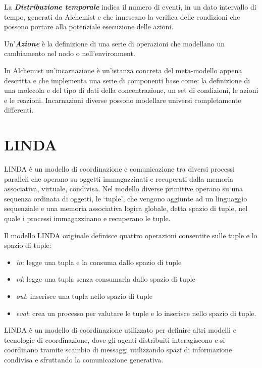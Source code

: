 La \textbf{\textit{Distribuzione temporale}} indica il numero di eventi, in un dato intervallo di tempo, generati da Alchemist e che innescano la verifica delle condizioni che possono portare alla potenziale esecuzione delle azioni.

Un'\textbf{\textit{Azione}} è la definizione di una serie di operazioni che modellano un cambiamento nel nodo o nell'environment.

In Alchemist un'incarnazione è un'istanza concreta del meta-modello appena descritta e che implementa una serie di componenti base come: la definizione di una molecola e del tipo di dati della concentrazione, un set di condizioni, le azioni e le reazioni. Incarnazioni diverse possono modellare universi completamente differenti.



\section{LINDA}
LINDA è un modello di coordinazione e comunicazione tra diversi processi paralleli che operano su oggetti immagazzinati e recuperati dalla memoria associativa, virtuale, condivisa. Nel modello diverse primitive operano su una sequenza ordinata di oggetti, le `tuple', che vengono aggiunte ad un linguaggio sequenziale e una memoria associativa logica globale, detta spazio di tuple, nel quale i processi immagazzinano e recuperano le tuple.

Il modello LINDA originale definisce quattro operazioni consentite sulle tuple e lo spazio di tuple:
\begin{itemize}
\item \textit{in}: legge una tupla e la consuma dallo spazio di tuple
\item \textit{rd}: legge una tupla senza consumarla dallo spazio di tuple
\item \textit{out}: inserisce una tupla nello spazio di tuple
\item \textit{eval}: crea un processo per valutare le tuple e lo inserisce nello spazio di tuple.
\end{itemize}

LINDA è un modello di coordinazione utilizzato per definire altri modelli e tecnologie di coordinazione, dove gli agenti distribuiti interagiscono e si coordinano tramite scambio di messaggi utilizzando spazi di informazione condivisa e sfruttando la comunicazione generativa.


